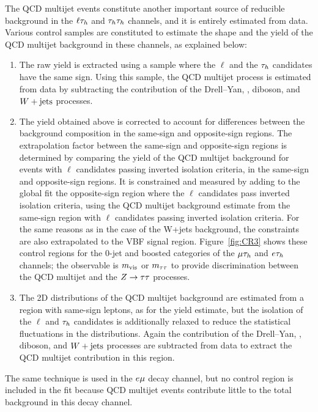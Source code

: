 The QCD multijet events constitute another important source of reducible background 
in the $\ell \tau_{h}$ and $\tau_{h}\tau_{h}$ channels, and it is entirely estimated from data. Various control samples are constituted to estimate the shape and the yield of the QCD multijet background in these channels, as explained below:
\begin{enumerate}
\item The raw yield is extracted using a sample where the
$\ell$ and the $\tau_{h}$ candidates have the same sign. Using this sample, the QCD multijet process is estimated from data by subtracting the contribution of the Drell--Yan, \ttbar, diboson,
and $W+\text{jets}$ processes.
\item The yield obtained above is corrected to account for differences between the background composition in the same-sign and opposite-sign regions. The extrapolation factor between the same-sign and opposite-sign regions is determined by comparing the yield of the QCD multijet background for events with $\ell$ candidates passing inverted isolation criteria, in the same-sign and opposite-sign regions. It is constrained and measured by adding to the global fit the opposite-sign region where the $\ell$ candidates pass inverted isolation criteria, using the QCD multijet background estimate from the same-sign region with $\ell$ candidates passing inverted isolation criteria. For the same reasons as in the case of the W+jets background, the constraints are also extrapolated to the VBF signal region. Figure~\ref{fig:CR3} shows these control regions for the 0-jet and boosted categories of the $\mu\tau_{h}$ and $e\tau_{h}$ channels; the observable is $m_\text{vis}$ or $m_{\tau\tau}$ to provide discrimination between the QCD multijet and the $Z\to\tau\tau$ processes.
\item The 2D distributions of the QCD multijet background are estimated from a region with same-sign leptons, as for the yield estimate, but the isolation of the $\ell$ and $\tau_{h}$ candidates is additionally relaxed to reduce the statistical fluctuations in the distributions. Again the contribution of the Drell--Yan, \ttbar, diboson,
and $W+ \text{jets}$ processes are subtracted from data to extract the QCD multijet contribution in this region.
\end{enumerate}
The same technique is used in the $e\mu$ decay channel, but no control region is included in the fit because QCD multijet events contribute little to the total background in this decay channel.


